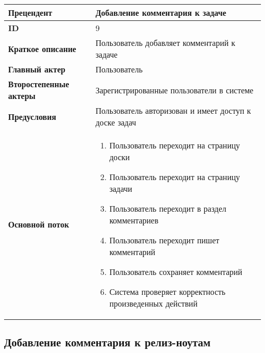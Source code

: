 \documentclass[14pt,a4paper]{extarticle}
\begin{document}
\begin{tabular}{|l|p{9cm}|}
	\hline
	\textbf{Прецендент}            & Добавление комментария к задаче                            \\
	\hline
	\textbf{ID}                    & 9                                                          \\
	\hline
	\textbf{Краткое описание}      & Пользователь добавляет комментарий к задаче                \\
	\hline
	\textbf{Главный актер}         & Пользователь                                               \\
	\hline
	\textbf{Второстепенные актеры} & Зарегистрированные пользователи в системе                  \\
	\hline
	\textbf{Предусловия}           & Пользователь авторизован и имеет доступ к доске задач      \\
	\hline
	\textbf{Основной поток}        & \begin{enumerate}
		                                 \item Пользователь переходит на страницу доски
		                                 \item Пользователь переходит на страницу задачи
		                                 \item Пользователь переходит в раздел комментариев
		                                 \item Пользователь переходит пишет комментарий
		                                 \item Пользователь сохраняет комментарий
		                                 \item Система проверяет корректность произведенных действий
	                                 \end{enumerate} \\
	\hline
\end{tabular}

\subsection{Добавление комментария к релиз-ноутам}
\end{document}
